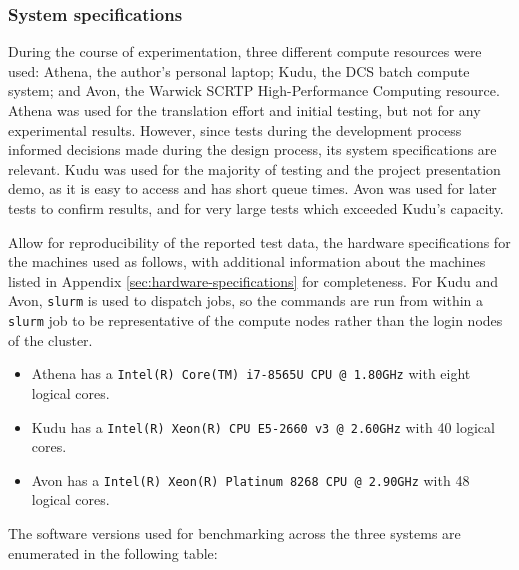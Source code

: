\subsubsection{System specifications}
\label{sssec:system-specifications}

During the course of experimentation, three different compute resources were used: Athena, the author's personal laptop; Kudu, the DCS batch compute system; and Avon, the Warwick SCRTP High-Performance Computing resource. Athena was used for the translation effort and initial testing, but not for any experimental results. However, since tests during the development process informed decisions made during the design process, its system specifications are relevant. Kudu was used for the majority of testing and the project presentation demo, as it is easy to access and has short queue times. Avon was used for later tests to confirm results, and for very large tests which exceeded Kudu's capacity.

Allow for reproducibility of the reported test data, the hardware specifications for the machines used as follows, with additional information about the machines listed in Appendix \ref{sec:hardware-specifications} for completeness. For Kudu and Avon, \texttt{slurm} is used to dispatch jobs, so the commands are run from within a \texttt{slurm} job to be representative of the compute nodes rather than the login nodes of the cluster.

\begin{itemize}
    \item Athena has a \texttt{Intel(R) Core(TM) i7-8565U CPU @ 1.80GHz} with eight logical cores.
    \item Kudu has a \texttt{Intel(R) Xeon(R) CPU E5-2660 v3 @ 2.60GHz} with 40 logical cores.
    \item Avon has a \texttt{Intel(R) Xeon(R) Platinum 8268 CPU @ 2.90GHz} with 48 logical cores.
\end{itemize}

The software versions used for benchmarking across the three systems are enumerated in the following table:

